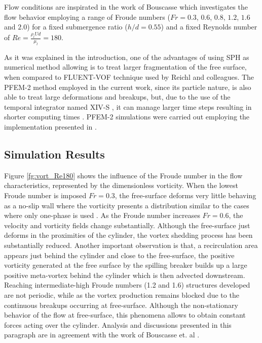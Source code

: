 Flow conditions are inspirated in the work of Bouscasse \cite{Bouscasse14} which investigates the flow behavior employing a range of Froude numbers ($Fr=0.3$, $0.6$, $0.8$, $1.2$, $1.6$ and $2.0$) for a fixed submergence ratio ($h/d=0.55$) and a fixed Reynolds number of $Re=\frac{\rho_l U d}{\mu_l}=180$.

As it was explained in the introduction, one of the advantages of using SPH as numerical method allowing is to treat larger fragmentation of the free surface, when compared to FLUENT-VOF technique used by Reichl and colleagues. The PFEM-2 method employed in the current work, since its particle nature, is also able to treat large deformations and breakups, but, due to the use of the temporal integrator named XIV-S \cite{Idelsohn12}, it can manage larger time steps resulting in shorter computing times \cite{Gimenez2015186}. PFEM-2 simulations were carried out employing the implementation presented in \cite{Gimenez14}.



\subsection{Simulation Results}

Figure \ref{fg:vort_Re180} shows the influence of the Froude number in the flow characteristics, represented by the dimensionless vorticity. When the lowest Froude number is imposed $Fr=0.3$, the free-surface deforms very little behaving as a no-slip wall where the vorticity presents a distribution similar to the cases where only one-phase is used \cite{PRICE2002175}. As the Froude number increases $Fr=0.6$, the velocity and vorticity fields change substantially. Although the free-surface just deforms in the proximities of the cylinder, the vortex shedding process has been substantially reduced. Another important observation is that, a recirculation area appears just behind the cylinder and close to the free-surface, the positive vorticity generated at the free surface by the spilling breaker builds up a large positive meta-vortex behind the cylinder which is then advected downstream. Reaching intermediate-high Froude numbers (1.2 and 1.6) structures developed are not periodic, while as the vortex production remains blocked due to the continuous breakups occurring at free-surface. Although the non-stationary behavior of the flow at free-surface, this phenomena allows to obtain constant forces acting over the cylinder. Analysis and discussions presented in this paragraph are in agreement with the work of Bouscasse et. al \cite{Bouscasse14}.

